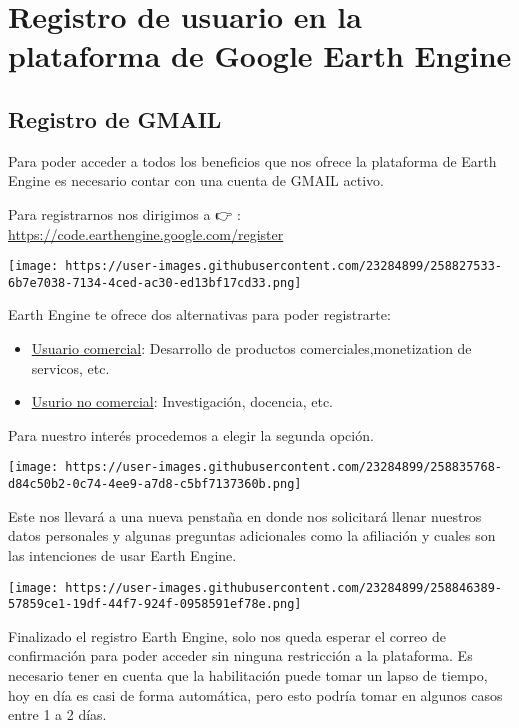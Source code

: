 \documentclass[
  letterpaper,
  DIV=11,
  numbers=noendperiod]{scrreprt}
\providecommand{\tightlist}{%
  \setlength{\itemsep}{0pt}\setlength{\parskip}{0pt}}\usepackage{longtable,booktabs,array}
\begin{document}

\hypertarget{registro-de-usuario-en-la-plataforma-de-google-earth-engine}{%
\chapter{Registro de usuario en la plataforma de Google Earth
Engine}\label{registro-de-usuario-en-la-plataforma-de-google-earth-engine}}

\hypertarget{registro-de-gmail}{%
\section{Registro de GMAIL}\label{registro-de-gmail}}

Para poder acceder a todos los beneficios que nos ofrece la plataforma
de Earth Engine es necesario contar con una cuenta de GMAIL activo.

Para registrarnos nos dirigimos a 👉 :
\url{https://code.earthengine.google.com/register}

\texttt{[image: https://user-images.githubusercontent.com/23284899/258827533-6b7e7038-7134-4ced-ac30-ed13bf17cd33.png]}

Earth Engine te ofrece dos alternativas para poder registrarte:

\begin{itemize}
\tightlist
\item
  \href{https://earthengine.google.com/commercial/}{Usuario comercial}:
  Desarrollo de productos comerciales,monetization de servicos, etc.
\item
  \href{https://earthengine.google.com/noncommercial/}{Usurio no
  comercial}: Investigación, docencia, etc.
\end{itemize}

Para nuestro interés procedemos a elegir la segunda opción.

\texttt{[image: https://user-images.githubusercontent.com/23284899/258835768-d84c50b2-0c74-4ee9-a7d8-c5bf7137360b.png]}

Este nos llevará a una nueva penstaña en donde nos solicitará llenar
nuestros datos personales y algunas preguntas adicionales como la
afiliación y cuales son las intenciones de usar Earth Engine.

\texttt{[image: https://user-images.githubusercontent.com/23284899/258846389-57859ce1-19df-44f7-924f-0958591ef78e.png]}

Finalizado el registro Earth Engine, solo nos queda esperar el correo de
confirmación para poder acceder sin ninguna restricción a la plataforma.
Es necesario tener en cuenta que la habilitación puede tomar un lapso de
tiempo, hoy en día es casi de forma automática, pero esto podría tomar
en algunos casos entre 1 a 2 días.
\end{document}
